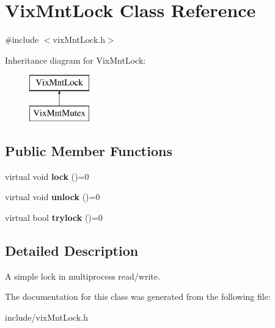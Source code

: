 \hypertarget{class_vix_mnt_lock}{}\section{Vix\+Mnt\+Lock Class Reference}
\label{class_vix_mnt_lock}


{\ttfamily \#include $<$vix\+Mnt\+Lock.\+h$>$}

Inheritance diagram for Vix\+Mnt\+Lock\+:\begin{figure}[H]
\begin{center}
\leavevmode
\includegraphics[height=2.000000cm]{class_vix_mnt_lock}
\end{center}
\end{figure}
\subsection*{Public Member Functions}
\begin{DoxyCompactItemize}
\item 
\hypertarget{class_vix_mnt_lock_a51959a3e7552eb06a4c874d6e32481d0}{}\label{class_vix_mnt_lock_a51959a3e7552eb06a4c874d6e32481d0} 
virtual void {\bfseries lock} ()=0
\item 
\hypertarget{class_vix_mnt_lock_a53ddefbb0a826ba02953aa5b958a3e51}{}\label{class_vix_mnt_lock_a53ddefbb0a826ba02953aa5b958a3e51} 
virtual void {\bfseries unlock} ()=0
\item 
\hypertarget{class_vix_mnt_lock_ac52916dc9053b0fe6cdbf834276ad120}{}\label{class_vix_mnt_lock_ac52916dc9053b0fe6cdbf834276ad120} 
virtual bool {\bfseries trylock} ()=0
\end{DoxyCompactItemize}


\subsection{Detailed Description}
A simple lock in multiprocess read/write. 

The documentation for this class was generated from the following file\+:\begin{DoxyCompactItemize}
\item 
include/vix\+Mnt\+Lock.\+h\end{DoxyCompactItemize}
